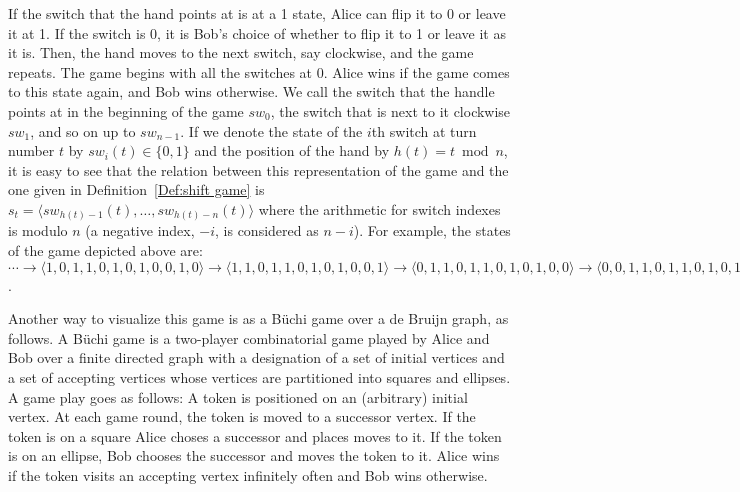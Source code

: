 \documentclass[final,12pt]{elsarticle}
\theoremstyle{definition} \newtheorem{definition}[theorem]{Definition} \newtheorem{observation}[theorem]{Observation} \newtheorem{example}[theorem]{Example} \newtheorem{remark}[theorem]{Remark} \newtheorem{corrolary}[theorem]{Corrolary}
\newcommand{\T}[1]{\langle{#1}\rangle}
\begin{document}
If the switch that the hand points at is at a 1 state, Alice can flip it to 0 or leave it at 1. If the switch is 0, it is Bob's choice of whether to flip it to 1 or leave it as it is. Then, the hand moves to the next switch, say clockwise, and the game repeats. The game begins with all the switches at 0. Alice wins if the game comes to this state again, and Bob wins otherwise. We call the switch that the handle points at in the beginning of the game $sw_0$, the switch that is next to it clockwise $sw_1$, and so on up to $sw_{n-1}$. If we denote the state of the $i$th switch at turn number $t$ by $sw_i(t) \in \{0,1\}$ and the position of the hand by $h(t) = t \bmod n$, it is easy to see that the relation between this representation of the game and the one given in Definition~\ref{Def:shift game} is $s_t=\langle sw_{h(t)-1}(t), \dots, sw_{h(t)-n}(t) \rangle$ where the arithmetic for switch indexes is modulo $n$ (a negative index, $-i$, is considered as $n-i$). For example, the states of the game depicted above are:
$\cdots \to \T{1,0,1,1,0,1,0,1,0,0,1,0} \to \T{1,1,0,1,1,0,1,0,1,0,0,1} \to \T{0,1,1,0,1,1,0,1,0,1,0,0} \to \T{0,0,1,1,0,1,1,0,1,0,1,0} \to \cdots$.

Another way to visualize this game is as a B\"uchi game over a de Bruijn graph, as follows. A B\"uchi game is a two-player combinatorial game played by Alice and Bob over a finite directed graph with a designation of a set of initial vertices and a set of accepting vertices whose vertices are partitioned into squares and ellipses. A game play goes as follows: A token is positioned on an (arbitrary) initial vertex. At each game round, the token is moved to a successor vertex. If the token is on a square Alice choses a successor and places moves to it. If the token is on an ellipse, Bob chooses the successor and moves the token to it. Alice wins if the token visits an accepting vertex infinitely often and Bob wins otherwise.
\end{document}
